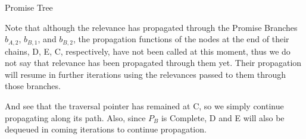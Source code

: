 \documentclass{article}
\begin{document}
\begin{minipage}{.5\textwidth}
\begin{center}

\vspace{0.3cm}
Promise Tree

\vspace{0.3cm}
\end{center}
\end{minipage}

Note that although the relevance has propagated through the Promise Branches $b_{A,2}$, $b_{B,1}$, and $b_{B,2}$, the propagation functions
of the nodes at the end of their chains, D, E, C, respectively, have not been called at this moment, thus we do not say that relevance
has been propagated through them yet. Their propagation will resume in further iterations using the relevances passed to them through
those branches.

And see that the traversal pointer has remained at C, so we simply continue propagating along its path.
Also, since $P_B$ is Complete, D and E will also be dequeued in coming iterations to continue propagation.
\end{document}
